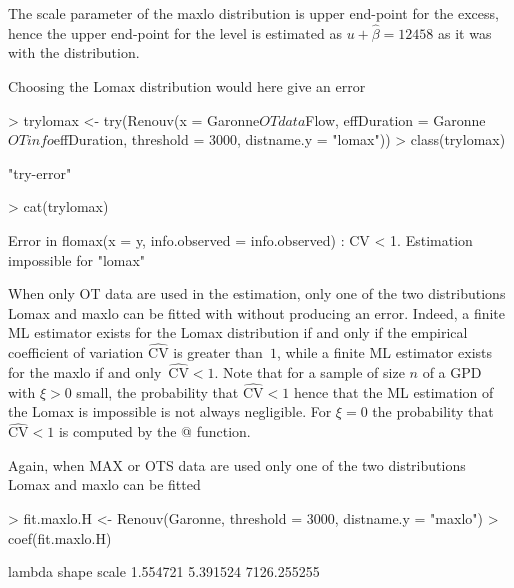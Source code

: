 \documentclass[a4paper]{report}
\begin{document}
\noindent
The scale parameter of the maxlo distribution is upper end-point for the excess, hence
the upper end-point for the level is estimated as 
$u + \widehat{\beta} = 12458$ as it was with the \verb@GPD@ distribution.

Choosing the Lomax distribution would here give an error

\begin{Schunk}
\begin{Sinput}
> trylomax <- try(Renouv(x = Garonne$OTdata$Flow,
                         effDuration = Garonne$OTinfo$effDuration,
                         threshold = 3000, distname.y = "lomax"))
> class(trylomax)
\end{Sinput}
\begin{Soutput}
[1] "try-error"
\end{Soutput}
\begin{Sinput}
> cat(trylomax)
\end{Sinput}
\begin{Soutput}
Error in flomax(x = y, info.observed = info.observed) : 
  CV < 1. Estimation impossible for "lomax"
\end{Soutput}
\end{Schunk}

\noindent
When only OT data are used in the
estimation, only one of the two distributions Lomax and maxlo can be
fitted with \verb@Renouv@ without producing an error. Indeed, a
finite ML estimator exists for the Lomax distribution if and only if the empirical
coefficient of variation $\widehat{\mathrm{CV}}$ is greater
than~$1$, while a finite ML estimator exists for the maxlo
if and only~$\widehat{\mathrm{CV}} < 1$. Note that for a
sample of size $n$ of a GPD with $\xi >0$ small, the probability that
$\widehat{\mathrm{CV}} < 1$ hence that the ML estimation of the Lomax
is impossible is not always negligible. For $\xi = 0$ the probability
that $\widehat{\mathrm{CV}} < 1$ is computed by the @
function.

Again, when MAX or OTS data are used only one of the two distributions
Lomax and maxlo can be fitted

\begin{Schunk}
\begin{Sinput}
> fit.maxlo.H <- Renouv(Garonne, threshold = 3000, distname.y = "maxlo")
> coef(fit.maxlo.H)
\end{Sinput}
\begin{Soutput}
     lambda       shape       scale 
   1.554721    5.391524 7126.255255 
\end{Soutput}
\end{Schunk}
\end{document}
